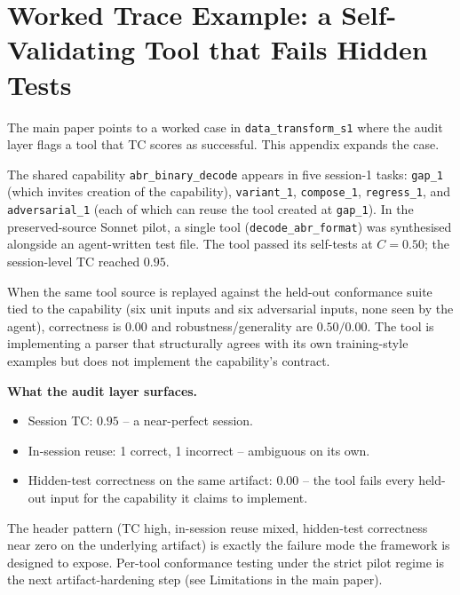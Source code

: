 \documentclass[sigconf,anonymous,review,natbib=false]{acmart}
\begin{document}
\section{Worked Trace Example: a Self-Validating Tool that Fails Hidden Tests}
\label{app:trace}

The main paper points to a worked case in \texttt{data\_transform\_s1}
where the audit layer flags a tool that TC scores as successful. This
appendix expands the case.

The shared capability \texttt{abr\_binary\_decode} appears in five
session-1 tasks: \texttt{gap\_1} (which invites creation of the
capability), \texttt{variant\_1}, \texttt{compose\_1},
\texttt{regress\_1}, and \texttt{adversarial\_1} (each of which can
reuse the tool created at \texttt{gap\_1}). In the preserved-source
Sonnet pilot, a single tool (\texttt{decode\_abr\_format}) was
synthesised alongside an agent-written test file. The tool passed
its self-tests at $C{=}0.50$; the session-level TC reached $0.95$.

When the same tool source is replayed against the held-out conformance
suite tied to the capability (six unit inputs and six adversarial
inputs, none seen by the agent), correctness is $0.00$ and
robustness/generality are $0.50/0.00$. The tool is implementing a
parser that structurally agrees with its own training-style examples
but does not implement the capability's contract.

\begin{tcolorbox}[colframe=black!70, colback=gray!5, boxrule=0.5pt]
\textbf{What the audit layer surfaces.}
\begin{itemize}[noitemsep,leftmargin=1.2em]
  \item Session TC: $0.95$ -- a near-perfect session.
  \item In-session reuse: 1 correct, 1 incorrect -- ambiguous on its own.
  \item Hidden-test correctness on the same artifact: $0.00$ -- the tool fails every held-out input for the capability it claims to implement.
\end{itemize}
\end{tcolorbox}

The header pattern (TC high, in-session reuse mixed, hidden-test
correctness near zero on the underlying artifact) is exactly the
failure mode the framework is designed to expose. Per-tool conformance
testing under the strict pilot regime is the next artifact-hardening
step (see Limitations in the main paper).
\end{document}
